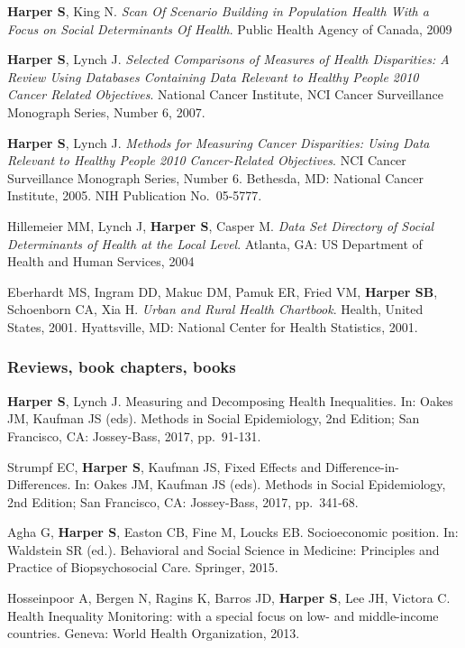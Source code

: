 \documentclass[
  letterpaper,
  DIV=11,
  numbers=noendperiod]{scrartcl}
\begin{document}
\textbf{Harper S}, King N. \emph{Scan Of Scenario Building in Population
Health With a Focus on Social Determinants Of Health}. Public Health
Agency of Canada, 2009

\textbf{Harper S}, Lynch J. \emph{Selected Comparisons of Measures of
Health Disparities: A Review Using Databases Containing Data Relevant to
Healthy People 2010 Cancer Related Objectives}. National Cancer
Institute, NCI Cancer Surveillance Monograph Series, Number 6, 2007.

\textbf{Harper S}, Lynch J. \emph{Methods for Measuring Cancer
Disparities: Using Data Relevant to Healthy People 2010 Cancer-Related
Objectives}. NCI Cancer Surveillance Monograph Series, Number 6.
Bethesda, MD: National Cancer Institute, 2005. NIH Publication
No.~05-5777.

Hillemeier MM, Lynch J, \textbf{Harper S}, Casper M. \emph{Data Set
Directory of Social Determinants of Health at the Local Level}. Atlanta,
GA: US Department of Health and Human Services, 2004

Eberhardt MS, Ingram DD, Makuc DM, Pamuk ER, Fried VM, \textbf{Harper
SB}, Schoenborn CA, Xia H. \emph{Urban and Rural Health Chartbook}.
Health, United States, 2001. Hyattsville, MD: National Center for Health
Statistics, 2001.

\subsubsection{Reviews, book chapters,
books}\label{reviews-book-chapters-books}

\textbf{Harper S}, Lynch J. Measuring and Decomposing Health
Inequalities. In: Oakes JM, Kaufman JS (eds). Methods in Social
Epidemiology, 2nd Edition; San Francisco, CA: Jossey-Bass, 2017,
pp.~91-131.

Strumpf EC, \textbf{Harper S}, Kaufman JS, Fixed Effects and
Difference-in-Differences. In: Oakes JM, Kaufman JS (eds). Methods in
Social Epidemiology, 2nd Edition; San Francisco, CA: Jossey-Bass, 2017,
pp.~341-68.

Agha G, \textbf{Harper S}, Easton CB, Fine M, Loucks EB. Socioeconomic
position. In: Waldstein SR (ed.). Behavioral and Social Science in
Medicine: Principles and Practice of Biopsychosocial Care. Springer,
2015.

Hosseinpoor A, Bergen N, Ragins K, Barros JD, \textbf{Harper S}, Lee JH,
Victora C. Health Inequality Monitoring: with a special focus on low-
and middle-income countries. Geneva: World Health Organization, 2013.
\end{document}
